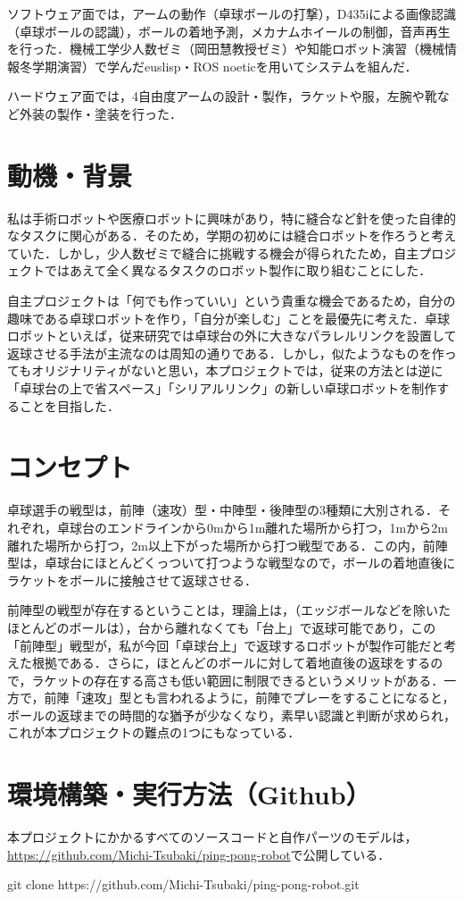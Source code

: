 \documentclass[10pt, oneside, titlepage]{ltjsarticle}  %
\begin{document}
ソフトウェア面では，アームの動作（卓球ボールの打撃），D435iによる画像認識（卓球ボールの認識），ボールの着地予測，メカナムホイールの制御，音声再生を行った．機械工学少人数ゼミ（岡田慧教授ゼミ）や知能ロボット演習（機械情報冬学期演習）で学んだeuslisp・ROS noeticを用いてシステムを組んだ．

ハードウェア面では，4自由度アームの設計・製作，ラケットや服，左腕や靴など外装の製作・塗装を行った．

\section{動機・背景}
私は手術ロボットや医療ロボットに興味があり，特に縫合など針を使った自律的なタスクに関心がある．そのため，学期の初めには縫合ロボットを作ろうと考えていた．しかし，少人数ゼミで縫合に挑戦する機会が得られたため，自主プロジェクトではあえて全く異なるタスクのロボット製作に取り組むことにした．

自主プロジェクトは「何でも作っていい」という貴重な機会であるため，自分の趣味である卓球ロボットを作り，「自分が楽しむ」ことを最優先に考えた．卓球ロボットといえば，従来研究では卓球台の外に大きなパラレルリンクを設置して返球させる手法が主流なのは周知の通りである．しかし，似たようなものを作ってもオリジナリティがないと思い，本プロジェクトでは，従来の方法とは逆に「卓球台の上で省スペース」「シリアルリンク」の新しい卓球ロボットを制作することを目指した．

\section{コンセプト}
卓球選手の戦型は，前陣（速攻）型・中陣型・後陣型の3種類に大別される．それぞれ，卓球台のエンドラインから0mから1m離れた場所から打つ，1mから2m離れた場所から打つ，2m以上下がった場所から打つ戦型である．この内，前陣型は，卓球台にほとんどくっついて打つような戦型なので，ボールの着地直後にラケットをボールに接触させて返球させる．

前陣型の戦型が存在するということは，理論上は，（エッジボールなどを除いたほとんどのボールは），台から離れなくても「台上」で返球可能であり，この「前陣型」戦型が，私が今回「卓球台上」で返球するロボットが製作可能だと考えた根拠である．さらに，ほとんどのボールに対して着地直後の返球をするので，ラケットの存在する高さも低い範囲に制限できるというメリットがある．一方で，前陣「速攻」型とも言われるように，前陣でプレーをすることになると，ボールの返球までの時間的な猶予が少なくなり，素早い認識と判断が求められ，これが本プロジェクトの難点の1つにもなっている．

\section{環境構築・実行方法（Github）}
本プロジェクトにかかるすべてのソースコードと自作パーツのモデルは， \url{https://github.com/Michi-Tsubaki/ping-pong-robot}で公開している．
\begin{screen}
git clone https://github.com/Michi-Tsubaki/ping-pong-robot.git
\end{screen}
\end{document}
